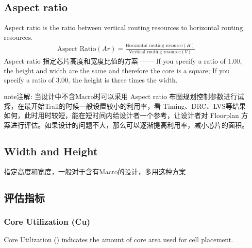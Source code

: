 \documentclass[letterpaper,10pt,english]{sphinxmanual}
\begin{document}
\subsection{Aspect ratio}
\label{\detokenize{chapter5/_u786e_u5b9a_u82af_u7247_u9762_u79ef:aspect-ratio}}
\sphinxAtStartPar
Aspect ratio is the ratio between vertical routing resources to horizontal routing resources.
\begin{equation}\label{equation:chapter5/确定芯片面积:math-single}
\begin{split}\text{Aspect Ratio}(Ar) = \frac{\text{Horizontal routing resource} (H)}{\text{Vertical routing resource} (V)}\end{split}
\end{equation}
\sphinxAtStartPar
Aspect ratio 指定芯片高度和宽度比值的方案 —— If you specify a ratio of 1.00, the height and width are the same and therefore the core is a square; If you specify a ratio of 3.00, the height is three times the width.

\begin{sphinxadmonition}{note}{注解:}
\sphinxAtStartPar
当设计中不含Macro时可以采用 Aspect ratio 布图规划控制参数进行试探，在最开始Trail的时候一般设置较小的利用率，看 Timing、DRC、LVS等结果如何，此时用时较短，能在短时间内给设计者一个参考，让设计者对 Floorplan 方案进行评估。如果设计的问题不大，那么可以逐渐提高利用率，减小芯片的面积。
\end{sphinxadmonition}


\subsection{Width and Height}
\label{\detokenize{chapter5/_u786e_u5b9a_u82af_u7247_u9762_u79ef:width-and-height}}
\sphinxAtStartPar
指定高度和宽度，一般对于含有Macro的设计，多用这种方案


\subsection{评估指标}
\label{\detokenize{chapter5/_u786e_u5b9a_u82af_u7247_u9762_u79ef:id2}}

\subsubsection{Core Utilization (Cu)}
\label{\detokenize{chapter5/_u786e_u5b9a_u82af_u7247_u9762_u79ef:core-utilization-cu}}
\sphinxAtStartPar
Core Utilization () indicates the amount of core area used for cell placement.
\end{document}
